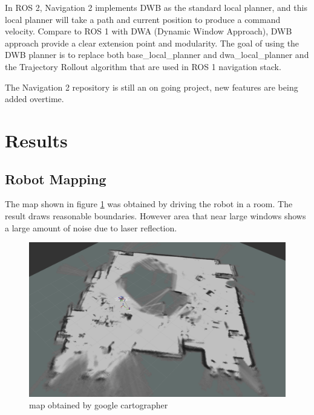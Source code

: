 \documentclass[letterpaper, 10 pt, conference]{ieeeconf}  %
\begin{document}
In ROS 2, Navigation 2 implements DWB as the standard local planner, and this local planner will take a path and current position to produce a command velocity\cite{c9}. Compare to ROS 1 with DWA (Dynamic Window Approach), DWB approach provide a clear extension point and modularity. The goal of using the DWB planner is to replace both base\_local\_planner and dwa\_local\_planner and the Trajectory Rollout algorithm that are used in ROS 1 navigation stack. 

The Navigation 2 repository is still an on going project, new features are being added overtime.  \par\vspace{8pt} 
\section{Results}\label{results}
\subsection{Robot Mapping}
The map shown in figure \ref{fig:map} was obtained by driving the robot in a room. The result draws reasonable boundaries. However area that near large windows shows a large amount of noise due to laser reflection. 
\begin{figure}[!pht]
  \includegraphics[width=\linewidth]{map.png}
  \caption{map obtained by google cartographer} 
  \label{fig:map}
\end{figure}
\end{document}
